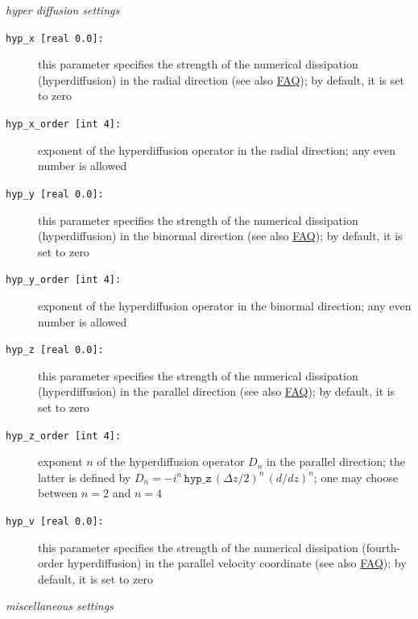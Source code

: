 \documentclass[12pt]{article}
\begin{document}
%
{\em hyper diffusion settings}
\begin{description}
\item[\texttt{hyp\_x [real 0.0]:}] this parameter specifies the strength of the numerical dissipation
  (hyperdiffusion) in the radial direction (see also \hyperlink{hyp-advice}{FAQ}); by default, it is set to zero
\item[\texttt{hyp\_x\_order [int 4]:}] exponent of the hyperdiffusion operator in the radial direction;
  any even number is allowed
\item[\texttt{hyp\_y [real 0.0]:}] this parameter specifies the strength of the numerical dissipation
  (hyperdiffusion) in the binormal direction (see also \hyperlink{hyp-advice}{FAQ}); by default, it is set to zero
\item[\texttt{hyp\_y\_order [int 4]:}] exponent of the hyperdiffusion operator in the binormal direction;
  any even number is allowed
\item[\texttt{hyp\_z [real 0.0]:}] this parameter specifies the strength of the numerical dissipation
  (hyperdiffusion) in the parallel direction (see also \hyperlink{hyp-advice}{FAQ}); by default, it is set to zero
\item[\texttt{hyp\_z\_order [int 4]:}] exponent $n$ of the hyperdiffusion operator $D_n$ in the parallel
  direction; the latter is defined by $D_n = - i^n\,\texttt{hyp\_z}\,(\Delta z/2)^n\,(d/dz)^n$; one may
  choose between $n=2$ and $n=4$
\item[\texttt{hyp\_v [real 0.0]:}] this parameter specifies the strength of the numerical dissipation
  (fourth-order hyperdiffusion) in the parallel velocity coordinate (see also \hyperlink{hyp-advice}{FAQ}); 
by default, it is set to zero
\end{description}
%
{\em miscellaneous settings}
\end{document}
